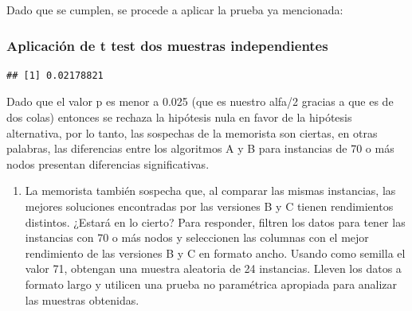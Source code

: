 \documentclass[
]{article}
\newenvironment{Shaded}{\begin{snugshade}}{\end{snugshade}}
\newcommand{\AttributeTok}[1]{\textcolor[rgb]{0.77,0.63,0.00}{#1}}
\newcommand{\ConstantTok}[1]{\textcolor[rgb]{0.00,0.00,0.00}{#1}}
\newcommand{\DecValTok}[1]{\textcolor[rgb]{0.00,0.00,0.81}{#1}}
\newcommand{\FloatTok}[1]{\textcolor[rgb]{0.00,0.00,0.81}{#1}}
\newcommand{\FunctionTok}[1]{\textcolor[rgb]{0.00,0.00,0.00}{#1}}
\newcommand{\NormalTok}[1]{#1}
\newcommand{\OtherTok}[1]{\textcolor[rgb]{0.56,0.35,0.01}{#1}}
\newcommand{\SpecialCharTok}[1]{\textcolor[rgb]{0.00,0.00,0.00}{#1}}
\newcommand{\StringTok}[1]{\textcolor[rgb]{0.31,0.60,0.02}{#1}}
\providecommand{\tightlist}{%
  \setlength{\itemsep}{0pt}\setlength{\parskip}{0pt}}
\begin{document}
Dado que se cumplen, se procede a aplicar la prueba ya mencionada:

\hypertarget{aplicaciuxf3n-de-t-test-dos-muestras-independientes}{%
\subsubsection{Aplicación de t test dos muestras
independientes}\label{aplicaciuxf3n-de-t-test-dos-muestras-independientes}}

\begin{Shaded}
\end{Shaded}

\begin{verbatim}
## [1] 0.02178821
\end{verbatim}

Dado que el valor p es menor a 0.025 (que es nuestro alfa/2 gracias a
que es de dos colas) entonces se rechaza la hipótesis nula en favor de
la hipótesis alternativa, por lo tanto, las sospechas de la memorista
son ciertas, en otras palabras, las diferencias entre los algoritmos A y
B para instancias de 70 o más nodos presentan diferencias
significativas.

\begin{enumerate}
\def\labelenumi{\arabic{enumi}.}
\setcounter{enumi}{1}
\tightlist
\item
  La memorista también sospecha que, al comparar las mismas instancias,
  las mejores soluciones encontradas por las versiones B y C tienen
  rendimientos distintos. ¿Estará en lo cierto? Para responder, filtren
  los datos para tener las instancias con 70 o más nodos y seleccionen
  las columnas con el mejor rendimiento de las versiones B y C en
  formato ancho. Usando como semilla el valor 71, obtengan una muestra
  aleatoria de 24 instancias. Lleven los datos a formato largo y
  utilicen una prueba no paramétrica apropiada para analizar las
  muestras obtenidas.
\end{enumerate}
\end{document}
